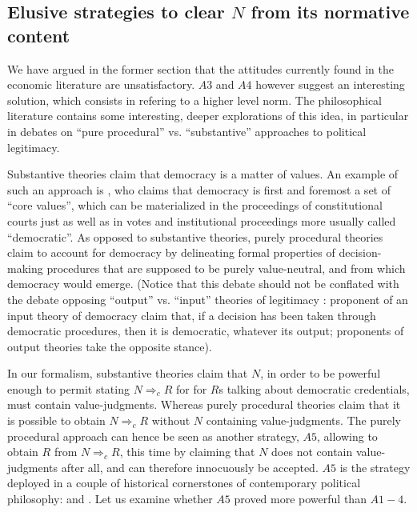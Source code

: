\documentclass[preprint, french, english, 11pt, authoryear]{elsarticle}%
\newcommand{\protectforpdf}[1]{\texorpdfstring{\ensuremath{#1}}{#1}}
\begin{document}
\subsection{Elusive strategies to clear \protectforpdf{N} from its normative content}
We have argued in the former section that the attitudes currently found in the economic literature are unsatisfactory. $A3$ and $A4$ however suggest an interesting solution, which consists in refering to a higher level norm. The philosophical literature contains some interesting, deeper explorations of this idea, in particular in debates on ``pure procedural'' vs. ``substantive'' approaches to political legitimacy.

Substantive theories claim that democracy is a matter of values. An example of such an approach is \cite{brettschneider_value_2006}, who claims that democracy is first and foremost a set of ``core values'', which can be materialized in the proceedings of constitutional courts just as well as in votes and institutional proceedings more usually called ``democratic''. As opposed to substantive theories, purely procedural theories claim to account for democracy by delineating formal properties of decision-making procedures that are supposed to be purely value-neutral, and from which democracy would emerge. (Notice that this debate should not be conflated with the debate opposing “output” vs. “input” theories of legitimacy \citep{vatn_environmental_2016, backstrand_environmental_2010}: proponent of an input theory of democracy claim that, if a decision has been taken through democratic procedures, then it is democratic, whatever its output; proponents of output theories take the opposite stance).

In our formalism, substantive theories claim that $N$, in order to be powerful enough to permit stating $N ⇒_c R$ for for $R$s talking about democratic credentials, must contain value-judgments. Whereas purely procedural theories claim that it is possible to obtain $N ⇒_c R$ without $N$ containing value-judgments. The purely procedural approach can hence be seen as another strategy, $A5$, allowing to obtain $R$ from $N ⇒_c R$, this time by claiming that $N$ does not contain value-judgments after all, and can therefore innocuously be accepted. $A5$ is the strategy deployed in a couple of historical cornerstones of contemporary political philosophy: \cite{rawls_political_2005} and \cite{habermas_moralbewustsein_1983}. Let us examine whether $A5$ proved more powerful than $A1-4$.
\end{document}
